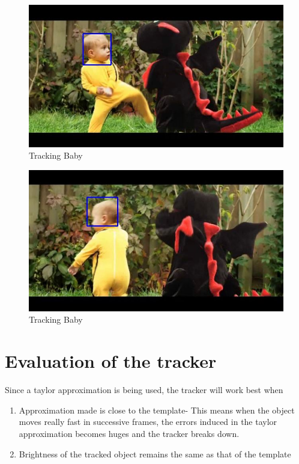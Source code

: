 \documentclass[12pt]{article}
\begin{document}
\begin{figure}[h]
    \centering
    \includegraphics[width=12cm]{trackbaby1}
    \caption{Tracking Baby}
    \label{fig:Tracking Baby}
\end{figure}
\newpage
\begin{figure}[h]
    \centering
    \includegraphics[width=12cm]{trackbaby2}
    \caption{Tracking Baby}
    \label{fig:Tracking Baby}
\end{figure}
\section{Evaluation of the tracker}
Since a taylor approximation is being used, the tracker will work best when 
\begin{enumerate}
  \item Approximation made is close to the template- This means when the object moves really fast in successive frames, the errors induced in the taylor approximation becomes huges and the tracker breaks down.
  \item Brightness of the tracked object remains the same as that of the template 
\end{enumerate}
\end{document}

